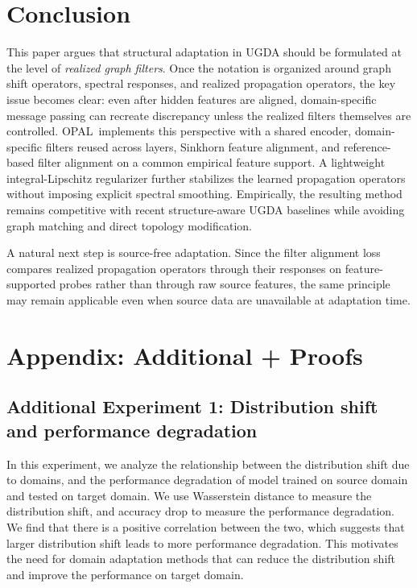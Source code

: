 \documentclass[runningheads]{llncs}
\newcommand{\model}{OPAL}
\begin{document}
\section{Conclusion}

This paper argues that structural adaptation in UGDA should be formulated at the level of \emph{realized graph filters}. Once the notation is organized around graph shift operators, spectral responses, and realized propagation operators, the key issue becomes clear: even after hidden features are aligned, domain-specific message passing can recreate discrepancy unless the realized filters themselves are controlled. \model\ implements this perspective with a shared encoder, domain-specific filters reused across layers, Sinkhorn feature alignment, and reference-based filter alignment on a common empirical feature support. A lightweight integral-Lipschitz regularizer further stabilizes the learned propagation operators without imposing explicit spectral smoothing. Empirically, the resulting method remains competitive with recent structure-aware UGDA baselines while avoiding graph matching and direct topology modification.

A natural next step is source-free adaptation. Since the filter alignment loss compares realized propagation operators through their responses on feature-supported probes rather than through raw source features, the same principle may remain applicable even when source data are unavailable at adaptation time.

\nocite{*}



\appendix
\section{Appendix: Additional + Proofs}

\subsection{Additional Experiment 1: Distribution shift and performance degradation}
In this experiment, we analyze the relationship between the distribution shift due to domains, and the performance degradation of model trained on source domain and tested on target domain. We use Wasserstein distance to measure the distribution shift, and accuracy drop to measure the performance degradation. We find that there is a positive correlation between the two, which suggests that larger distribution shift leads to more performance degradation. This motivates the need for domain adaptation methods that can reduce the distribution shift and improve the performance on target domain.
\end{document}
